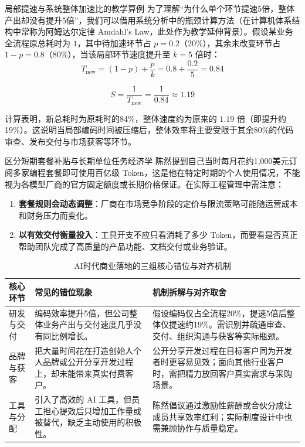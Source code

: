 \documentclass[UTF8,a4paper,11pt,fontset=fandol]{ctexart}
\begin{document}
\begin{knowledgebox}{局部提速与系统整体加速比的教学算例}
为了理解“为什么单个环节提速5倍，整体产出却没有提升5倍”，我们可以借用系统分析中的瓶颈计算方法（在计算机体系结构中常称为阿姆达尔定律 Amdahl's Law，此处作为教学延伸背景）。假设某业务全流程原总耗时为 \(1\)，其中待加速环节占 \(p = 0.2\)（20\%），其余未改变环节占 \(1 - p = 0.8\)（80\%），当该局部环节速度提升至 \(k = 5\) 倍时：
\[
T_{\text{new}} = (1 - p) + \frac{p}{k} = 0.8 + \frac{0.2}{5} = 0.84
\]

\[
S = \frac{1}{T_{\text{new}}} = \frac{1}{0.84} \approx 1.19
\]

计算表明，新总耗时为原耗时的84\%，整体速度约为原来的 \(1.19\) 倍（即提升约19\%）。这说明当局部编码时间被压缩后，整体效率将主要受限于其余80\%的代码审查、发布交付与市场获客等环节。
\end{knowledgebox}
\begin{importantbox}{区分短期套餐补贴与长期单位任务经济学}
陈然提到自己当时每月花约1,000美元订阅多家编程套餐即可使用百亿级 Token，这是他在特定时期的个人使用情况，不能视为各模型厂商的官方固定额度或长期价格保证。在实际工程管理中需注意：
\begin{enumerate}
\item \textbf{套餐规则会动态调整}：厂商在市场竞争阶段的定价与限流策略可能随运营成本和财务压力而变化。
\item \textbf{以有效交付衡量投入}：工具开支不应只看消耗了多少 Token，而要看是否真正帮助团队完成了高质量的产品功能、文档交付或业务验证。
\end{enumerate}
\end{importantbox}
\begin{table}[H]\centering\small
\caption{AI时代商业落地的三组核心错位与对齐机制}
\begin{tabular}{>{\raggedright\arraybackslash}p{\dimexpr(\linewidth-6\tabcolsep)/3\relax}>{\raggedright\arraybackslash}p{\dimexpr(\linewidth-6\tabcolsep)/3\relax}>{\raggedright\arraybackslash}p{\dimexpr(\linewidth-6\tabcolsep)/3\relax}}
\toprule
核心环节 & 常见的错位现象 & 机制拆解与对齐取舍\\\midrule
研发与交付 & 编码效率提升5倍，但公司整体业务产出与交付速度几乎没有同比例增长。 & 假设编码仅占全流程20\%，提速5倍后整体仅提速约19\%。需识别并疏通审查、交付、组织沟通与获客等实际瓶颈。\\[4pt]
品牌与获客 & 把大量时间花在打造创始人个人品牌或公开分享开发过程上，却未能带来真实付费客户。 & 公开分享开发过程在目标客户同为开发者时更容易见效；面向其他行业客户时，需把精力放回客户真实需求与采购场景。\\[4pt]
工具与分配 & 引入了高效的 AI 工具，但员工担心提效后只增加工作量或被替代，缺乏主动使用的积极性。 & 陈然倡议通过激励性薪酬或合伙分成让成员共享效率红利；实际制度设计中也需兼顾协作与质量稳定。\\[4pt]
\bottomrule\end{tabular}\end{table}
\end{document}
